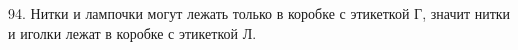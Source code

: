 94. Нитки и лампочки могут лежать только в коробке с этикеткой Г, значит нитки и иголки лежат в коробке с этикеткой Л.\\
